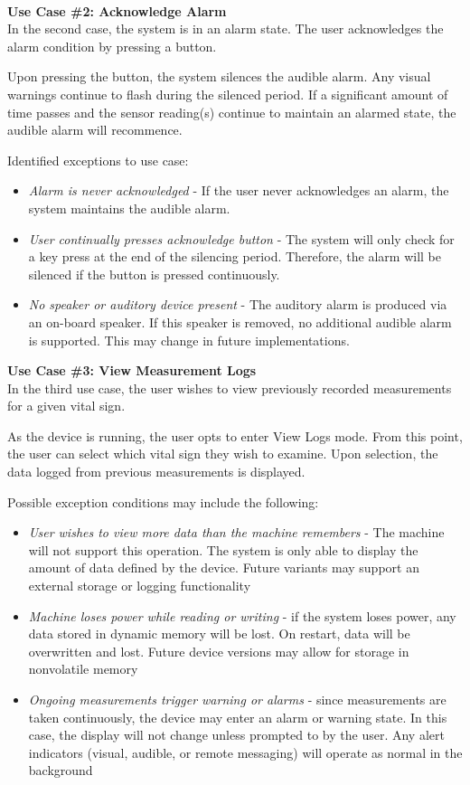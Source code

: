 \documentclass[12pt]{article} %
\begin{document}
~\\
\textbf{Use Case \#2: Acknowledge Alarm} \\
In the second case, the system is in an alarm state. The user acknowledges
the alarm condition by pressing a button.

Upon pressing the button, the system silences the audible alarm. Any visual
warnings continue to flash during the silenced period. If a significant amount
of time passes and the sensor reading(s) continue to maintain an alarmed state,
the audible alarm will recommence.

Identified exceptions to use case:
\begin{itemize}
	\item \emph{Alarm is never acknowledged} - If the user never acknowledges an alarm, the system maintains the audible alarm.
	\item \emph{User continually presses acknowledge button} - The system will
		only check for a key press at the end of the silencing period. Therefore,
		the alarm will be silenced if the button is pressed continuously.
	\item \emph{No speaker or auditory device present} - The auditory alarm is
		produced via an on-board speaker. If this speaker is removed, no additional
		audible alarm is supported. This may change in future implementations.
\end{itemize}
\textbf{Use Case \#3: View Measurement Logs} \\
In the third use case, the user wishes to view previously recorded measurements for a given vital sign.

As the device is running, the user opts to enter View Logs mode. From this
point, the user can select which vital sign they wish to examine. Upon
selection, the data logged from previous measurements is displayed.

Possible exception conditions may include the following:
\begin{itemize}
  \item \emph{User wishes to view more data than the machine remembers} - The
    machine will not support this operation. The system is only able to display
    the amount of data defined by the device. Future variants may support an
    external storage or logging functionality
  \item \emph{Machine loses power while reading or writing} - if the system
    loses power, any data stored in dynamic memory will be lost. On restart,
    data will be overwritten and lost. Future device versions may allow for
    storage in nonvolatile memory
  \item \emph{Ongoing measurements trigger warning or alarms} - since
    measurements are taken continuously, the device may enter an alarm or
    warning state. In this case, the display will not change unless prompted to
    by the user. Any alert indicators (visual, audible, or remote messaging)
    will operate as normal in the background
\end{itemize}
\end{document}
